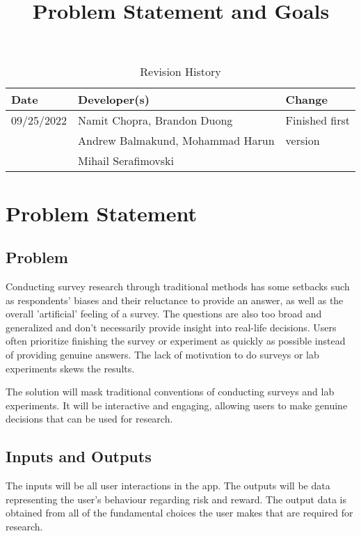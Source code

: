 \documentclass{article}
\title{Problem Statement and Goals\\\progname}
\author{\authname}
\date{}
\begin{document}
\maketitle

\begin{table}[hp]
\caption{Revision History} \label{TblRevisionHistory}
\begin{tabularx}{\textwidth}{llX}
\toprule
\textbf{Date} & \textbf{Developer(s)} & \textbf{Change}\\
\midrule
 09/25/2022 & Namit Chopra, Brandon Duong  & Finished first \\
 & Andrew Balmakund, Mohammad Harun & version\\
 & Mihail Serafimovski & \\
\bottomrule
\end{tabularx}
\end{table}

\section{Problem Statement}


\subsection{Problem}
Conducting survey research through traditional methods has some setbacks such as respondents' biases and their reluctance to provide an answer, as well as the overall 'artificial' feeling of a survey. The questions are also too broad and generalized and don't necessarily provide insight into real-life decisions. Users often prioritize finishing the survey or experiment as quickly as possible instead of providing genuine answers. The lack of motivation to do surveys or lab experiments skews the results.

The solution will mask traditional conventions of conducting surveys and lab experiments. It will be interactive and engaging, allowing users to make genuine decisions that can be used for research.

\subsection{Inputs and Outputs}
The inputs will be all user interactions in the app. The outputs will be data representing the user's behaviour regarding risk and reward. The output data is obtained from all of the fundamental choices the user makes that are required for research. 
\end{document}
